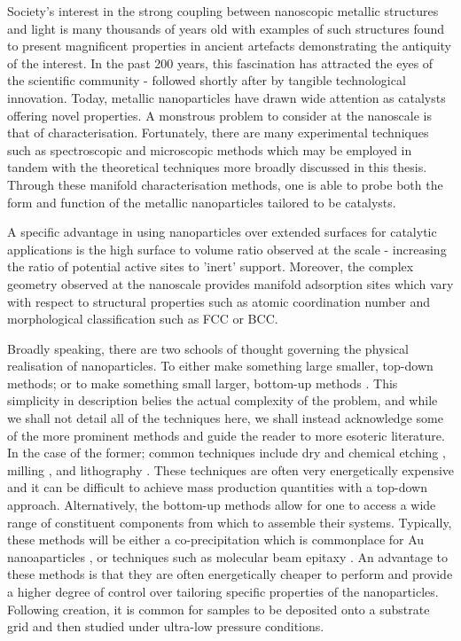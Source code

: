 Society's interest in the strong coupling between nanoscopic metallic structures and light is many thousands of years old with examples of such structures found to present magnificent properties in ancient artefacts demonstrating the antiquity of the interest. In the past 200 years, this fascination has attracted the eyes of the scientific community - followed shortly after by tangible technological innovation. Today, metallic nanoparticles have drawn wide attention as catalysts offering novel properties. A monstrous problem to consider at the nanoscale is that of characterisation. Fortunately, there are many experimental techniques such as spectroscopic and microscopic methods which may be employed in tandem with the theoretical techniques more broadly discussed in this thesis. Through these manifold characterisation methods, one is able to probe both the form and function of the metallic nanoparticles tailored to be catalysts.

A specific advantage in using nanoparticles over extended surfaces for catalytic applications is the high surface to volume ratio observed at the scale - increasing the ratio of potential active sites to 'inert' support. Moreover, the complex geometry observed at the nanoscale provides manifold adsorption sites which vary with respect to structural properties such as atomic coordination number and morphological classification such as FCC or BCC. 

Broadly speaking, there are two schools of thought governing the physical realisation of nanoparticles. To either make something large smaller, top-down methods; or to make something small larger, bottom-up methods \cite{Fra_Review}. This simplicity in description belies the actual complexity of the problem, and while we shall not detail all of the techniques here, we shall instead acknowledge some of the more prominent methods and guide the reader to more esoteric literature. In the case of the former; common techniques include dry and chemical etching \cite{Etching}, milling \cite{AuMilling}, and lithography \cite{AuLithography}. These techniques are often very energetically expensive and it can be difficult to achieve mass production quantities with a top-down approach. Alternatively, the bottom-up methods allow for one to access a wide range of constituent components from which to assemble their systems. Typically, these methods will be either a co-precipitation which is commonplace for Au nanoaparticles \cite{AuCoprecip}, or techniques such as molecular beam epitaxy \cite{AuEpitaxy}. An advantage to these methods is that they are often energetically cheaper to perform and provide a higher degree of control over tailoring specific properties of the nanoparticles. Following creation, it is common for samples to be deposited onto a substrate grid and then studied under ultra-low pressure conditions.

